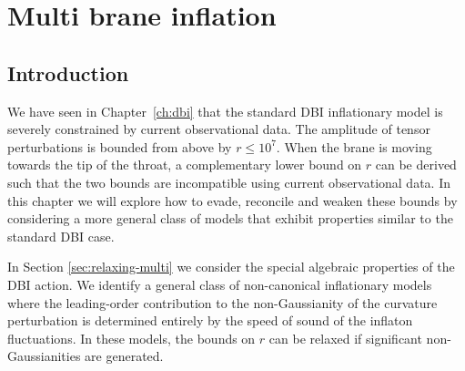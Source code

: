 \renewcommand{\CVSrevision}{\version$Id: multibrane.tex,v 1.50 2009/10/13 21:13:16 ith Exp $}

\chapter{Multi brane inflation}
\label{ch:multibrane}

\section{Introduction}
\label{sec:intro-multi}
We have seen in Chapter~\ref{ch:dbi} that the standard DBI inflationary model
is severely constrained by current observational data. The amplitude of tensor
perturbations is bounded from above by $r\le 10^7$. When the brane is moving
towards the tip of the throat, a complementary lower bound
on $r$ can be derived such that the two bounds are incompatible using
current observational data. In this chapter we will explore
how to evade, reconcile and weaken these bounds by considering a more general
class of models that exhibit properties similar to the standard DBI case.


In Section \ref{sec:relaxing-multi} we consider the special algebraic
properties of the DBI action.
We identify a general class of non-canonical inflationary models
where the leading-order contribution to the non-Gaussianity of the 
curvature perturbation is determined 
entirely by the speed of sound of the inflaton fluctuations. 
In these models, the bounds on $r$ can be relaxed 
if significant non-Gaussianities are generated.


